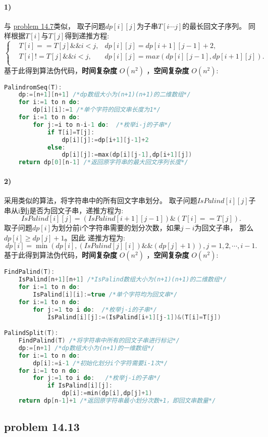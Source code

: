 \documentclass[11pt,a4paper,oneside,oldfontcommands]{ctexart}
\begin{document}
\paragraph*{1)}与 \hyperlink{14.7}{problem 14.7}类似，
取子问题$dp[i][j]$为子串$T[i\cdots j]$的最长回文子序列。
同样根据$T[i]$与$T[j]$得到递推方程:
$$\left\{
	\begin{aligned}
		&T[i]==T[j]\&\&i<j,&dp[i][j]=dp[i+1][j-1]+2,\\
		&T[i]!=T[j]\&\&i<j,&dp[i][j]=max(dp[i][j-1],dp[i+1][j]).\\
	\end{aligned}
\right.
$$
基于此得到算法伪代码，\textbf{时间复杂度} $O(n^2)$
，\textbf{空间复杂度} $O(n^2)$:
\begin{lstlisting}[language=C++,title=PalindromSeq.func]
PalindromSeq(T):
	dp:=[n+1][n+1] /*dp数组大小为(n+1)(n+1)的二维数组*/
 	for i:=1 to n do:
		dp[i][i]:=1 /*单个字符的回文串长度为1*/
	for i:=1 to n do:
		for j:=i to n-i-1 do:  /*枚举i-j的子串*/
			if T[i]=T[j]:
				dp[i][j]:=dp[i+1][j-1]+2
			else:
				dp[i][j]:=max(dp[i][j-1],dp[i+1][j])
	return dp[0][n-1] /*返回原字符串的最大回文序列长度*/
\end{lstlisting}
\paragraph*{2)}采用类似的算法，将字符串中的所有回文字串划分。
取子问题$IsPalind[i][j]$子串从i到j是否为回文子串，递推方程为:
$$
IsPalind[i][j]=(IsPalind[i+1][j-1])\&(T[i]==T[j]).
$$
取子问题$dp[i]$为划分前i个字符串需要的划分次数，如果$j-i$为回文子串，
那么$dp[i]\geq dp[j]+1$。因此
递推方程为:
$$
dp[i]=\min(dp[i],(IsPalind[j][i])\&\&(dp[j]+1)),j=1,2,\cdots, i-1.
$$
基于此得到算法伪代码，\textbf{时间复杂度} $O(n^2)$
，\textbf{空间复杂度} $O(n^2)$:
\begin{lstlisting}[language=C++,title=PalindSplit.func]
FindPalind(T):
	IsPalind[n+1][n+1] /*IsPalind数组大小为(n+1)(n+1)的二维数组*/
	for i:=1 to n do:
		IsPalind[i][i]:=true /*单个字符均为回文串*/
	for i:=1 to n do:
		for j:=1 to i do:  /*枚举j-i的子串*/
			IsPalind[i][j]:=(IsPalind[i+1][j-1])&(T[i]=T[j])

PalindSplit(T):
	FindPalind(T) /*将字符串中所有的回文子串进行标记*/
	dp:=[n+1] /*dp数组大小为(n+1)的一维数组*/
 	for i:=1 to n do:
		dp[i]:=i-1 /*初始化划分i个字符需要i-1次*/
	for i:=1 to n do:
		for j:=1 to i do:   /*枚举j-i的子串*/
			if IsPalind[i][j]:
				dp[i]:=min(dp[i],dp[j]+1)
	return dp[n-1]+1 /*返回原字符串最小划分次数+1，即回文串数量*/
\end{lstlisting}
{\subsection*{problem 14.13}}
\end{document}
